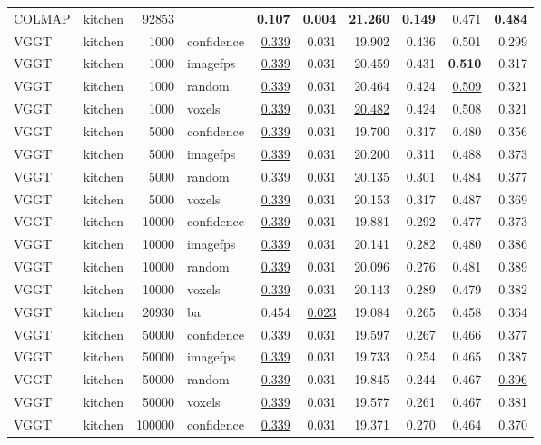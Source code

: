 \begin{table}[H]
\begin{tabular}{llrlrrrrrr}
\midrule
COLMAP & kitchen & 92853 &  & \textbf{0.107} & \textbf{0.004} & \textbf{21.260} & \textbf{0.149} & 0.471 & \textbf{0.484} \\
VGGT & kitchen & 1000 & confidence & \underline{0.339} & 0.031 & 19.902 & 0.436 & 0.501 & 0.299 \\
VGGT & kitchen & 1000 & imagefps & \underline{0.339} & 0.031 & 20.459 & 0.431 & \textbf{0.510} & 0.317 \\
VGGT & kitchen & 1000 & random & \underline{0.339} & 0.031 & 20.464 & 0.424 & \underline{0.509} & 0.321 \\
VGGT & kitchen & 1000 & voxels & \underline{0.339} & 0.031 & \underline{20.482} & 0.424 & 0.508 & 0.321 \\
VGGT & kitchen & 5000 & confidence & \underline{0.339} & 0.031 & 19.700 & 0.317 & 0.480 & 0.356 \\
VGGT & kitchen & 5000 & imagefps & \underline{0.339} & 0.031 & 20.200 & 0.311 & 0.488 & 0.373 \\
VGGT & kitchen & 5000 & random & \underline{0.339} & 0.031 & 20.135 & 0.301 & 0.484 & 0.377 \\
VGGT & kitchen & 5000 & voxels & \underline{0.339} & 0.031 & 20.153 & 0.317 & 0.487 & 0.369 \\
VGGT & kitchen & 10000 & confidence & \underline{0.339} & 0.031 & 19.881 & 0.292 & 0.477 & 0.373 \\
VGGT & kitchen & 10000 & imagefps & \underline{0.339} & 0.031 & 20.141 & 0.282 & 0.480 & 0.386 \\
VGGT & kitchen & 10000 & random & \underline{0.339} & 0.031 & 20.096 & 0.276 & 0.481 & 0.389 \\
VGGT & kitchen & 10000 & voxels & \underline{0.339} & 0.031 & 20.143 & 0.289 & 0.479 & 0.382 \\
VGGT & kitchen & 20930 & ba & 0.454 & \underline{0.023} & 19.084 & 0.265 & 0.458 & 0.364 \\
VGGT & kitchen & 50000 & confidence & \underline{0.339} & 0.031 & 19.597 & 0.267 & 0.466 & 0.377 \\
VGGT & kitchen & 50000 & imagefps & \underline{0.339} & 0.031 & 19.733 & 0.254 & 0.465 & 0.387 \\
VGGT & kitchen & 50000 & random & \underline{0.339} & 0.031 & 19.845 & 0.244 & 0.467 & \underline{0.396} \\
VGGT & kitchen & 50000 & voxels & \underline{0.339} & 0.031 & 19.577 & 0.261 & 0.467 & 0.381 \\
VGGT & kitchen & 100000 & confidence & \underline{0.339} & 0.031 & 19.371 & 0.270 & 0.464 & 0.370 \\

\end{tabular}
\end{table}
